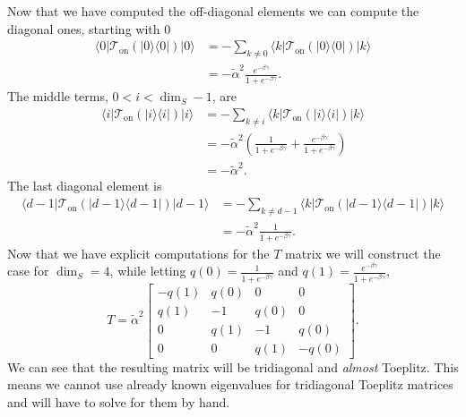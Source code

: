 \documentclass{article}
\newcommand{\on}{\text{on}}
\newcommand{\ket}[1]{|#1\rangle}
\newcommand{\bra}[1]{\langle #1|}
\newcommand{\ketbra}[2]{| #1\rangle\! \langle #2|}
\begin{document}
Now that we have computed the off-diagonal elements we can compute the diagonal ones, starting with $0$
\begin{align}
    \bra{0} \mathcal{T}_{\on}(\ketbra{0}{0}) \ket{0} &= - \sum_{k \neq 0} \bra{k} \mathcal{T}_{\on}(\ketbra{0}{0}) \ket{k} \\
    &= - \widetilde{\alpha}^2 \frac{e^{-\beta \gamma}}{1 + e^{-\beta \gamma}}.
\end{align}
The middle terms, $0 < i < \dim_S - 1$, are 
\begin{align}
    \bra{i}\mathcal{T}_{\on}(\ketbra{i}{i}) \ket{i} &= - \sum_{k \neq i}  \bra{k} \mathcal{T}_{\on}(\ketbra{i}{i}) \ket{k} \\
    &= -\widetilde{\alpha}^2 \left( \frac{1}{1 + e^{-\beta \gamma}} + \frac{e^{-\beta \gamma}}{1 + e^{-\beta \gamma}} \right) \\
    &= -\widetilde{\alpha}^2.
\end{align}
The last diagonal element is
\begin{align}
    \bra{d - 1} \mathcal{T}_{\on}(\ketbra{d - 1}{d-1}) \ket{d - 1} &= - \sum_{k \neq d - 1} \bra{k} \mathcal{T}_{\on}(\ketbra{d-1}{d-1}) \ket{k} \\
    &= - \widetilde{\alpha}^2 \frac{1}{1 + e^{-\beta \gamma}}.
\end{align}
Now that we have explicit computations for the $T$ matrix we will construct the case for $\dim_S = 4$, while letting $q(0) = \frac{1}{1 + e^{-\beta \gamma}}$ and $q(1) = \frac{e^{-\beta \gamma}}{1 + e^{-\beta \gamma}}$, 
\begin{equation}
    T = \widetilde{\alpha}^2 \begin{bmatrix}
        -q(1) & q(0) & 0 & 0 \\
        q(1) & -1 & q(0) & 0 \\
        0 & q(1) & -1 & q(0) \\
        0 & 0 & q(1) & - q(0)
    \end{bmatrix}.
\end{equation}
We can see that the resulting matrix will be tridiagonal and \emph{almost} Toeplitz. This means we cannot use already known eigenvalues for tridiagonal Toeplitz matrices and will have to solve for them by hand.
\end{document}
